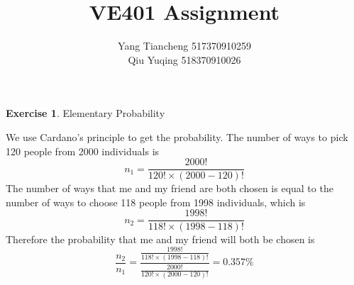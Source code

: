 \documentclass[12pt,a4paper]{article}
\makeatletter
\theoremstyle{definition}
\newtheorem{exercise}{Exercise}
\newtheorem*{solution}{Solution}
\renewenvironment{solution}[1][Solution] {\par\pushQED{\qed}\normalfont\topsep6\p@\@plus6\p@\relax\trivlist\item[\hskip\labelsep\bfseries#1\@addpunct{.}]\ignorespaces}{\popQED\endtrivlist\@endpefalse} \makeatother
\makeatother
\begin{document}
\title{VE401 Assignment}
\author{Yang Tiancheng 517370910259\\Qiu Yuqing 518370910026}

\maketitle

\newpage

\begin{exercise}
Elementary Probability
\begin{solution}
We use Cardano's principle to get the probability. The number of ways to pick 120 people from 2000 individuals is
$$n_1=\frac{2000!}{120!\times(2000-120)!}$$
The number of ways that me and my friend are both chosen is equal to the number of ways to choose 118 people from 1998 individuals, which is
$$n_2=\frac{1998!}{118!\times(1998-118)!}$$
Therefore the probability that me and my friend will both be chosen is
$$\frac{n_2}{n_1}=\frac{\frac{1998!}{118!\times(1998-118)!}}{\frac{2000!}{120!\times(2000-120)!}}=0.357\%$$
\end{solution}
\end{exercise}
\end{document}
